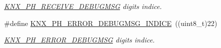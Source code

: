 \begin{DoxyCompactItemize}
\begin{DoxyCompactList}\small\item\em \hyperlink{group___k_n_x___p_h___sup___private___variables_ga29eb5f6a2e306cf5545c5a6af4623e35}{K\+N\+X\+\_\+\+P\+H\+\_\+\+R\+E\+C\+E\+I\+V\+E\+\_\+\+D\+E\+B\+U\+G\+M\+SG} digits indice. \end{DoxyCompactList}\item 
\#define \hyperlink{group___k_n_x___p_h___sup___private___variables_ga3901497762df9a18c2051bab3ca7b86c}{K\+N\+X\+\_\+\+P\+H\+\_\+\+E\+R\+R\+O\+R\+\_\+\+D\+E\+B\+U\+G\+M\+S\+G\+\_\+\+I\+N\+D\+I\+CE}~((uint8\+\_\+t)22)\hypertarget{group___k_n_x___p_h___sup___private___variables_ga3901497762df9a18c2051bab3ca7b86c}{}\label{group___k_n_x___p_h___sup___private___variables_ga3901497762df9a18c2051bab3ca7b86c}

\begin{DoxyCompactList}\small\item\em \hyperlink{group___k_n_x___p_h___sup___private___variables_ga598da98824813e3e2781a39bb3f90bfd}{K\+N\+X\+\_\+\+P\+H\+\_\+\+E\+R\+R\+O\+R\+\_\+\+D\+E\+B\+U\+G\+M\+SG} digits indice. \end{DoxyCompactList}\end{DoxyCompactItemize}
